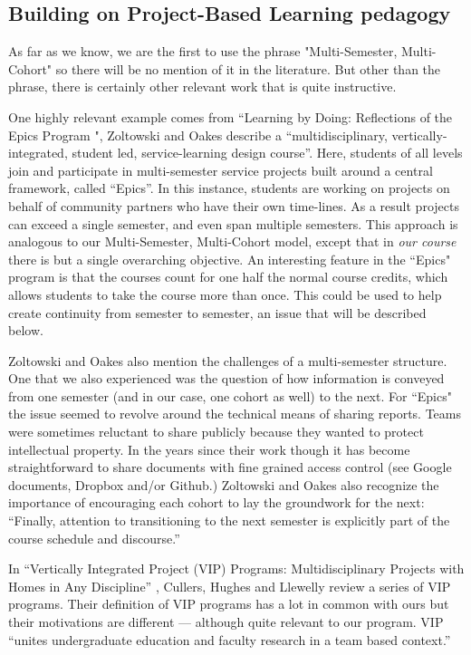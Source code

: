 \subsection{Building on Project-Based Learning pedagogy}
As far as we know, we are the first to use the phrase "Multi-Semester, Multi-Cohort" so there will be no mention of it in the literature. But other than the phrase, there is certainly other relevant work that is quite instructive. 

One highly relevant example comes from ``Learning by Doing: Reflections of the Epics Program \cite{Epics}", Zoltowski and Oakes describe a ``multidisciplinary, vertically-integrated, student led, service-learning design course''. Here, students of all levels join and participate in multi-semester service projects built around a central framework, called ``Epics''. In this instance, students are working on projects on behalf of community partners who have their own time-lines. As a result projects can exceed a single semester, and even span multiple semesters. This approach is analogous to our Multi-Semester, Multi-Cohort model, except that in \textit{our course} there is but a single overarching objective. An interesting feature in the ``Epics" program is that the courses count for one half the normal course credits, which allows students to take the course more than once. This could be used to help create continuity from semester to semester, an issue that will be described below. 

Zoltowski and Oakes also mention the challenges of a multi-semester structure. One that we also experienced was the question of how information is conveyed from one semester (and in our case, one cohort as well) to the next. For ``Epics" the issue seemed to revolve around the technical means of sharing reports. Teams were sometimes reluctant to share publicly because they wanted to protect intellectual property. In the years since their work though it has become straightforward to share documents with fine grained access control (see Google documents, Dropbox and/or Github.) Zoltowski and Oakes also recognize the importance of encouraging each cohort to lay the groundwork for the next: ``Finally, attention to transitioning to the next semester is explicitly part of the course schedule and discourse.''

In ``Vertically Integrated Project (VIP) Programs: Multidisciplinary Projects with Homes in Any Discipline'' \cite{VIP}, Cullers, Hughes and Llewelly review a series of VIP programs. Their definition of VIP programs has a lot in common with ours but their motivations are different --- although quite relevant to our program. VIP ``unites undergraduate education and faculty research in a team based context.'' 


